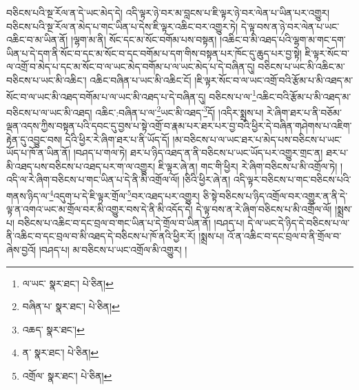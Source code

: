 བཅིངས་པའི་སྔ་རོལ་ན་དེ་ཡང་མེད་དེ། འདི་ལྟར་ཉེ་བར་མ་བླངས་པ་ཇི་ལྟར་ཉེ་བར་ལེན་པ་ཡིན་པར་འགྱུར། བཅིངས་པའི་སྔ་རོལ་ན་མེད་པ་གང་ཡིན་པ་དེས་ཇི་ལྟར་འཆིང་བར་འགྱུར་ཏེ། དེ་ལྟ་བས་ན་ཉེ་བར་ལེན་པ་ཡང་འཆིང་བ་མ་ཡིན་ནོ། །ལྷག་མ་ནི། སོང་དང་མ་སོང་བགོམ་པས་བསྟན། །འཆིང་བ་མི་འཐད་པའི་ལྷག་མ་གང་དག་ཡིན་པ་དེ་དག་ནི་སོང་བ་དང་མ་སོང་བ་དང་བགོམ་པ་དག་གིས་བསྟན་པར་ཁོང་དུ་ཆུད་པར་བྱ་སྟེ། ཇི་ལྟར་སོང་བ་ལ་འགྲོ་བ་མེད་པ་དང་མ་སོང་བ་ལ་ཡང་མེད་བགོམ་པ་ལ་ཡང་མེད་པ་དེ་བཞིན་དུ། བཅིངས་པ་ཡང་མི་འཆིང་མ་བཅིངས་པ་ཡང་མི་འཆིང་། འཆིང་བཞིན་པ་ཡང་མི་འཆིང་ངོ། །ཇི་ལྟར་སོང་བ་ལ་ཡང་འགྲོ་བའི་རྩོམ་པ་མི་འཐད་མ་སོང་བ་ལ་ཡང་མི་འཐད་བགོམ་པ་ལ་ཡང་མི་འཐད་པ་དེ་བཞིན་དུ། བཅིངས་པ་ལ་\footnote{ལ་ཡང་  སྣར་ཐང་།  པེ་ཅིན། }འཆིང་བའི་རྩོམ་པ་མི་འཐད་མ་བཅིངས་པ་ལ་ཡང་མི་འཐད། འཆིང་:བཞིན་པ་ལ་\footnote{བཞིན་པ་  སྣར་ཐང་།  པེ་ཅིན། }ཡང་མི་འཐད་\footnote{འཆད་  སྣར་ཐང་། }དོ། །འདིར་སྨྲས་པ། རེ་ཞིག་ཐར་པ་ནི་བཅོམ་ལྡན་འདས་ཀྱིས་བསྟན་པའི་དབང་དུ་བྱས་པ་སྟེ་འགྲོ་བ་རྣམ་པར་ཐར་པར་བྱ་བའི་ཕྱིར་དེ་བཞིན་གཤེགས་པ་འཇིག་རྟེན་དུ་འབྱུང་བས། དེའི་ཕྱིར་རེ་ཞིག་ཐར་པ་ནི་ཡོད་དོ། །མ་བཅིངས་པ་ལ་ཡང་ཐར་པ་མེད་པས་བཅིངས་པ་ཡང་ཡོད་པ་ཁོ་ན་ཡིན་ནོ། །བཤད་པ་གལ་ཏེ། ཐར་པ་ཉིད་འཐད་ན་ནི་བཅིངས་པ་ཡང་ཡོད་པར་འགྱུར་གྲང་ན། ཐར་པ་མི་འཐད་པས་བཅིངས་པ་འཐད་པར་ག་ལ་འགྱུར། ཇི་ལྟར་ཞེ་ན། གང་གི་ཕྱིར། རེ་ཞིག་བཅིངས་པ་མི་འགྲོལ་ཏེ། །འདི་ལ་རེ་ཞིག་བཅིངས་པ་གང་ཡིན་པ་དེ་ནི་མི་འགྲོལ་ལོ། །ཅིའི་ཕྱིར་ཞེ་ན། འདི་ལྟར་བཅིངས་པ་གང་བཅིངས་པའི་གནས་ཉིད་ལ་\footnote{ན་  སྣར་ཐང་།  པེ་ཅིན། }འདུག་པ་དེ་ཇི་ལྟར་གྲོལ་\footnote{འགྲོལ་  སྣར་ཐང་།  པེ་ཅིན། }བར་འཐད་པར་འགྱུར། ཅི་སྟེ་བཅིངས་པ་ཉིད་འགྲོལ་བར་འགྱུར་ན་ནི་དེ་ལྟ་ན་འགའ་ཡང་མ་གྲོལ་བར་མི་འགྱུར་བས་དེ་ནི་མི་འདོད་དེ། དེ་ལྟ་བས་ན་རེ་ཞིག་བཅིངས་པ་མི་འགྲོལ་ལོ། །སྨྲས་པ། བཅིངས་པ་འཆིང་བ་དང་བྲལ་བ་གང་ཡིན་པ་དེ་གྲོལ་བ་ཡིན་ནོ། །བཤད་པ། དེ་ལ་ཡང་དེ་ཉིད་དེ་བཅིངས་པ་ལ་ནི་འཆིང་བ་དང་བྲལ་བ་མི་འཐད་དེ་བཅིངས་པ་ཁོ་ནའི་ཕྱིར་རོ། །སྨྲས་པ། འོ་ན་འཆིང་བ་དང་བྲལ་བ་ནི་གྲོལ་བ་ཞེས་བྱའོ། །བཤད་པ། མ་བཅིངས་པ་ཡང་འགྲོལ་མི་འགྱུར། །

